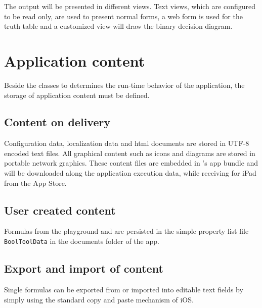 The output will be presented in different views. Text views, which are configured to be read only, are used to present normal forms, 
a web form is used for the truth table and a customized view will draw the binary decision diagram.



\section{Application content}

Beside the classes to determines the run-time behavior of the application,
the storage of application content must be defined.

\subsection{Content on delivery}

Configuration data, localization data and html documents
are stored in UTF-8 encoded text files.
All graphical content such as icons and diagrams are stored in portable network graphics.
These content files are embedded in \Nyaya's app bundle
and will be downloaded along the application execution data,
while receiving \Nyaya for iPad from the App Store.

\subsection{User created content}

Formulas from the playground and \BoolTool are persisted 
in the simple property list file \verb+BoolToolData+ 
in the documents folder of the app.

\subsection{Export and import of content}

Single formulas can be exported from or imported into editable text fields 
by simply using the standard copy and paste mechanism of iOS.




